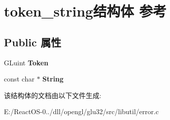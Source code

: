 \hypertarget{structtoken__string}{}\section{token\+\_\+string结构体 参考}
\label{structtoken__string}
\subsection*{Public 属性}
\begin{DoxyCompactItemize}
\item 
\mbox{\label{structtoken__string_a9eac56efaf31431a2448f37d9732a846}} 
G\+Luint {\bfseries Token}
\item 
\mbox{\label{structtoken__string_aea58062aed12b4118ecdd7b52a98db3c}} 
const char $\ast$ {\bfseries String}
\end{DoxyCompactItemize}


该结构体的文档由以下文件生成\+:\begin{DoxyCompactItemize}
\item 
E\+:/\+React\+O\+S-\/0../dll/opengl/glu32/src/libutil/error.\+c\end{DoxyCompactItemize}
